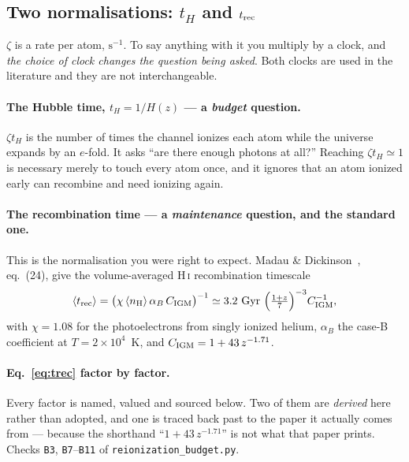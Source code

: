 \documentclass[11pt,a4paper]{article}
\newcommand{\ion}[2]{\textsc{#1\,\MakeLowercase{#2}}}
\begin{document}
\subsection{Two normalisations: \texorpdfstring{$t_H$}{t_H} and
            \texorpdfstring{$t_{\rm rec}$}{t_rec}}\label{sec:norm}
$\zeta$ is a rate per atom, $\mathrm{s^{-1}}$. To say anything with it you
multiply by a clock, and \emph{the choice of clock changes the question being
asked}. Both clocks are used in the literature and they are not
interchangeable.

\paragraph{The Hubble time, $t_H = 1/H(z)$ --- a \emph{budget} question.}
$\zeta t_H$ is the number of times the channel ionizes each atom while the
universe expands by an $e$-fold. It asks ``are there enough photons at all?''
Reaching $\zeta t_H \simeq 1$ is necessary merely to touch every atom once, and
it ignores that an atom ionized early can recombine and need ionizing again.

\paragraph{The recombination time --- a \emph{maintenance} question, and the
standard one.} This is the normalisation you were right to expect. Madau \&
Dickinson~\cite{md14}, eq.~(24), give the volume-averaged
\ion{H}{i} recombination timescale
\begin{equation}
  \langle t_{\rm rec}\rangle = \bigl(\chi\,\langle n_{\rm H}\rangle\,
  \alpha_B\,C_{\rm IGM}\bigr)^{-1}
  \simeq 3.2\ \mathrm{Gyr}\ \Bigl(\tfrac{1+z}{7}\Bigr)^{-3} C_{\rm IGM}^{-1},
  \label{eq:trec}
\end{equation}
with $\chi = 1.08$ for the photoelectrons from singly ionized helium,
$\alpha_B$ the case-B coefficient at $T = 2\times10^4$~K, and $C_{\rm IGM} = 1 +
43\,z^{-1.71}$. \paragraph{Eq.~\eqref{eq:trec} factor by factor.} Every factor is named, valued
and sourced below. Two of them are \emph{derived} here rather than adopted, and
one is traced back past \cite{md14} to the paper it actually comes from ---
because the shorthand ``$1 + 43\,z^{-1.71}$'' is not what that paper prints.
Checks \texttt{B3}, \texttt{B7}--\texttt{B11} of
\texttt{reionization\_budget.py}.
\end{document}
